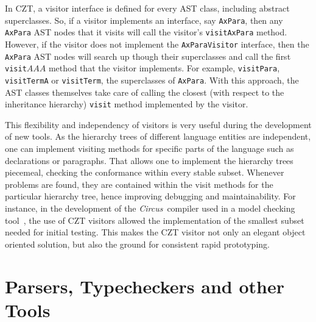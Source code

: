 \documentclass{llncs}
\newcommand{\Circus}{{\sf\slshape Circus}}
\newcommand{\Interface}[1]{\texttt{#1}}
\newcommand{\Method}[1]{\texttt{#1}}
\begin{document}
  In CZT, a visitor interface is defined for every AST class,
  including abstract superclasses.  So, if a visitor implements an
  interface, say \Interface{AxPara}, then any \Interface{AxPara} AST
  nodes that it visits will call the visitor's \Method{visitAxPara}
  method.  However, if the visitor does not implement the
  \Interface{AxParaVisitor} interface, then the \Interface{AxPara} AST
  nodes will search up though their superclasses and call the first
  \Method{visit$AAA$} method that the visitor implements. For example,
  \Interface{visitPara}, \Interface{visitTermA} or \Interface{visitTerm},
  the superclasses of \Interface{AxPara}.
  With this approach, the AST classes themselves take care of calling
  the closest (with respect to the inheritance hierarchy)
  \Method{visit} method implemented by the visitor.

  This flexibility and independency of visitors is very useful during
  the development of new tools.  As the hierarchy trees of different
  language entities are independent, one can implement visiting
  methods for specific parts of the language such as declarations or
  paragraphs.  That allows one to implement the hierarchy trees
  piecemeal, checking the conformance within every stable subset.
  Whenever problems are found, they are contained within the visit
  methods for the particular hierarchy tree, hence improving debugging
  and maintainability.  For instance, in the development of the
  \Circus\ compiler used in a model checking
  tool~\cite{circus.mc:leo}, the use of CZT visitors allowed the
  implementation of the smallest subset needed for initial testing.
  This makes the CZT visitor not only an elegant object oriented
  solution, but also the ground for consistent rapid prototyping.

\section{Parsers, Typecheckers and other Tools}
\end{document}
